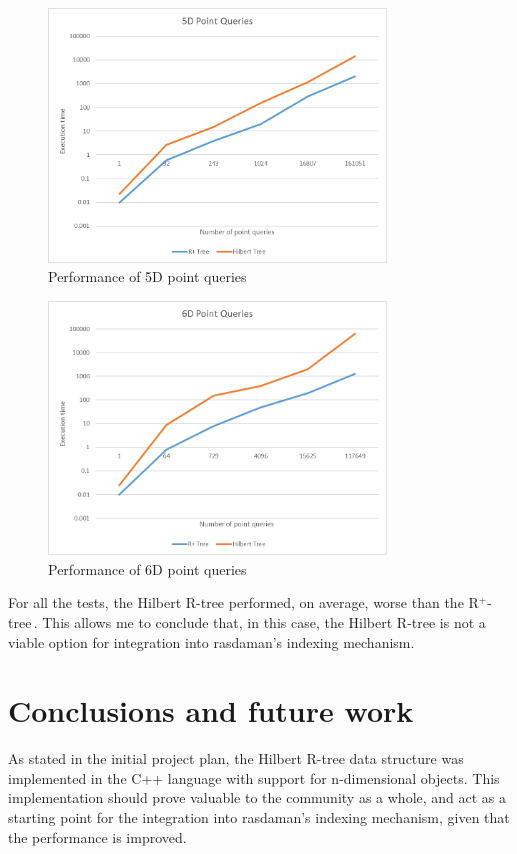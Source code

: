 \documentclass[11pt, a4paper, oneside]{article}
\newcommand{\rtree}{R$^+$-tree$\,$}
\begin{document}
\begin{enumerate}
\begin{figure}[H]
  \centering
    \includegraphics[width=0.8\textwidth]{img/point5d}
      \caption{Performance of 5D point queries}
  \label{fig:point5D}
\end{figure}

\begin{figure}[H]
  \centering
    \includegraphics[width=0.8\textwidth]{img/point6d}
      \caption{Performance of 6D point queries}
  \label{fig:point6D}
\end{figure}
\end{enumerate}

For all the tests, the Hilbert R-tree performed, on average, worse than the \rtree . This allows me to conclude that, in this case, the Hilbert R-tree is not a viable option for integration into rasdaman's indexing mechanism.

\section{Conclusions and future work}
\label{sec:conclusions}
As stated in the initial project plan, the Hilbert R-tree data structure was implemented in the C++ language with support for n-dimensional objects. This implementation should prove valuable to the community as a whole, and act as a starting point for the integration into rasdaman's indexing mechanism, given that the performance is improved.
\end{document}
